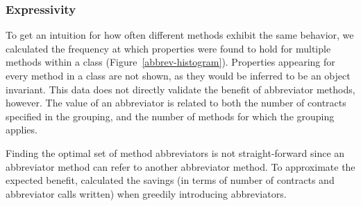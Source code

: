 %
%
%


\subsubsection{Expressivity}
To get an intuition for how often different methods exhibit the same
behavior, we calculated the frequency at which
properties were found to hold for multiple methods within a class
(Figure~\ref{abbrev-histogram}). Properties appearing for every method
in a class are not shown, as they would be inferred to be an object
invariant.
%
This data does not directly validate the benefit of abbreviator
methods, however. The value of an abbreviator is related to both the
number of contracts specified in the grouping, and the number of
methods for which the grouping applies.

Finding the optimal set of method abbreviators is not straight-forward
since an abbreviator method can refer to another abbreviator method.
To approximate the expected benefit, calculated the savings (in terms
of number of contracts and abbreviator calls written) when greedily
introducing abbreviators. 

